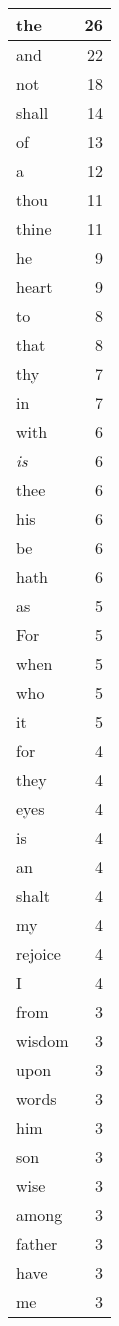 \begin{center}
\begin{longtable}{l|r}
the & 26\\ \hline 
and & 22\\ \hline 
not & 18\\ \hline 
shall & 14\\ \hline 
of & 13\\ \hline 
a & 12\\ \hline 
thou & 11\\ \hline 
thine & 11\\ \hline 
he & 9\\ \hline 
heart & 9\\ \hline 
to & 8\\ \hline 
that & 8\\ \hline 
thy & 7\\ \hline 
in & 7\\ \hline 
with & 6\\ \hline 
\emph{is} & 6\\ \hline 
thee & 6\\ \hline 
his & 6\\ \hline 
be & 6\\ \hline 
hath & 6\\ \hline 
as & 5\\ \hline 
For & 5\\ \hline 
when & 5\\ \hline 
who & 5\\ \hline 
it & 5\\ \hline 
for & 4\\ \hline 
they & 4\\ \hline 
eyes & 4\\ \hline 
is & 4\\ \hline 
an & 4\\ \hline 
shalt & 4\\ \hline 
my & 4\\ \hline 
rejoice & 4\\ \hline 
I & 4\\ \hline 
from & 3\\ \hline 
wisdom & 3\\ \hline 
upon & 3\\ \hline 
words & 3\\ \hline 
him & 3\\ \hline 
son & 3\\ \hline 
wise & 3\\ \hline 
among & 3\\ \hline 
father & 3\\ \hline 
have & 3\\ \hline 
me & 3\\ \hline 

\end{longtable}
\end{center}
